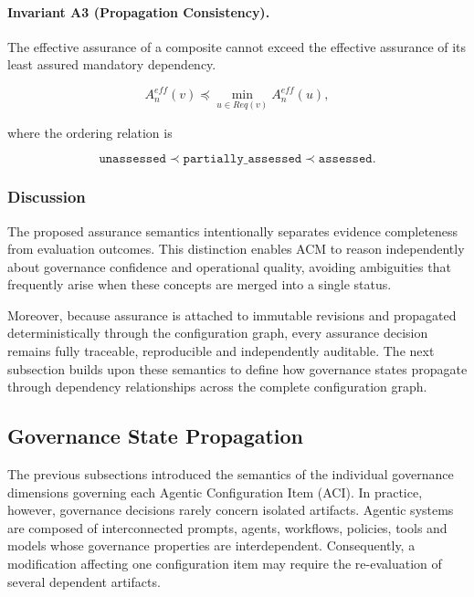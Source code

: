 \documentclass[10pt]{article}
\begin{document}
\paragraph{Invariant A3 (Propagation Consistency).}

The effective assurance of a composite cannot exceed the effective assurance of
its least assured mandatory dependency.

\begin{equation}
A_n^{eff}(v)
\preceq
\min_{u\in Req(v)}
A_n^{eff}(u),
\label{eq:assurance_inv3}
\end{equation}

where the ordering relation is

\[
\texttt{unassessed}
\prec
\texttt{partially\_assessed}
\prec
\texttt{assessed}.
\]

\subsubsection{Discussion}

The proposed assurance semantics intentionally separates evidence completeness
from evaluation outcomes. This distinction enables ACM to reason independently
about governance confidence and operational quality, avoiding ambiguities that
frequently arise when these concepts are merged into a single status.

Moreover, because assurance is attached to immutable revisions and propagated
deterministically through the configuration graph, every assurance decision
remains fully traceable, reproducible and independently auditable. The next
subsection builds upon these semantics to define how governance states
propagate through dependency relationships across the complete configuration
graph.

\subsection{Governance State Propagation}
\label{subsec:governance_state_propagation}

The previous subsections introduced the semantics of the individual governance
dimensions governing each Agentic Configuration Item (ACI). In practice,
however, governance decisions rarely concern isolated artifacts. Agentic
systems are composed of interconnected prompts, agents, workflows, policies,
tools and models whose governance properties are interdependent. Consequently,
a modification affecting one configuration item may require the re-evaluation
of several dependent artifacts.
\end{document}
